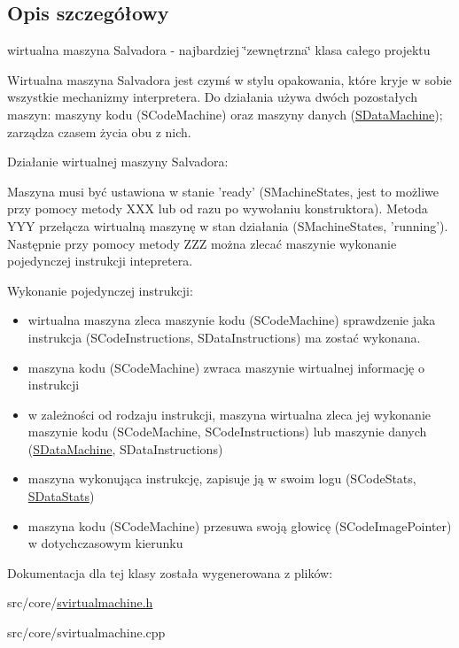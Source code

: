 \subsection{Opis szczegółowy}
wirtualna maszyna Salvadora - najbardziej \char`\"{}zewnętrzna\char`\"{} klasa całego projektu 

Wirtualna maszyna Salvadora jest czymś w stylu opakowania, które kryje w sobie wszystkie mechanizmy interpretera. Do działania używa dwóch pozostałych maszyn: maszyny kodu (SCodeMachine) oraz maszyny danych (\hyperlink{classSDataMachine}{SDataMachine}); zarządza czasem życia obu z nich.

Działanie wirtualnej maszyny Salvadora:

Maszyna musi być ustawiona w stanie 'ready' (SMachineStates, jest to możliwe przy pomocy metody XXX lub od razu po wywołaniu konstruktora). Metoda YYY przełącza wirtualną maszynę w stan działania (SMachineStates, 'running'). Następnie przy pomocy metody ZZZ można zlecać maszynie wykonanie pojedynczej instrukcji intepretera.

Wykonanie pojedynczej instrukcji:

\begin{itemize}
\item wirtualna maszyna zleca maszynie kodu (SCodeMachine) sprawdzenie jaka instrukcja (SCodeInstructions, SDataInstructions) ma zostać wykonana.\item maszyna kodu (SCodeMachine) zwraca maszynie wirtualnej informację o instrukcji\item w zależności od rodzaju instrukcji, maszyna wirtualna zleca jej wykonanie maszynie kodu (SCodeMachine, SCodeInstructions) lub maszynie danych (\hyperlink{classSDataMachine}{SDataMachine}, SDataInstructions)\item maszyna wykonująca instrukcję, zapisuje ją w swoim logu (SCodeStats, \hyperlink{classSDataStats}{SDataStats})\item maszyna kodu (SCodeMachine) przesuwa swoją głowicę (SCodeImagePointer) w dotychczasowym kierunku \end{itemize}


Dokumentacja dla tej klasy została wygenerowana z plików:\begin{CompactItemize}
\item 
src/core/\hyperlink{svirtualmachine_8h}{svirtualmachine.h}\item 
src/core/svirtualmachine.cpp\end{CompactItemize}
